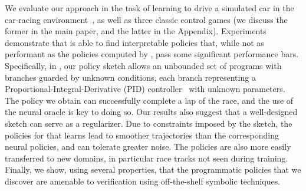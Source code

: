 We evaluate our approach in the task of learning to drive a simulated
car in the \torcs car-racing environment~\citep{TORCS}, as well as
three classic control games (we discuss the former in the main paper,
and the latter in the Appendix). Experiments demonstrate that \algo is
able to find interpretable policies that, while not as performant as
the policies computed by \drl, pass some significant performance
bars. Specifically, in \torcs, our policy sketch allows an unbounded
set of programs with branches guarded by unknown conditions, each
branch representing a Proportional-Integral-Derivative (PID)
controller~\citep{aastrom1995pid} with unknown parameters. The policy we
obtain can successfully
complete a lap of the race, and the use of the neural oracle is
key to doing so. Our results also suggest that a well-designed sketch can serve as a
regularizer. Due to constraints imposed by the sketch, the
policies for \torcs that \algo learns lead to smoother trajectories
than the corresponding neural policies, and can tolerate greater noise. The policies are also more easily transferred to new
domains, in particular race tracks not seen during training. Finally,
we show, using several properties, that the programmatic
policies that we discover are amenable to verification using
off-the-shelf symbolic techniques.

